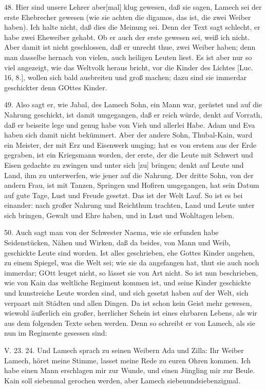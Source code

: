 48. Hier sind unsere Lehrer aber[mal] klug gewesen, daß sie sagen, Lamech sei der erste Ehebrecher gewesen (wie sie achten die digamos, das ist, die zwei Weiber haben). Ich halte nicht, daß dies die Meinung sei. Denn der Text sagt schlecht, er habe zwei Eheweiber gehabt. Ob er auch der erste gewesen sei, weiß ich nicht. Aber damit ist nicht geschlossen, daß er unrecht thue, zwei Weiber haben; denn man dasselbe hernach von vielen, auch heiligen Leuten liest. Es ist aber nur so viel angezeigt, wie das Weltvolk heraus bricht, vor die Kinder des Lichtes [Luc. 16, 8.], wollen sich bald ausbreiten und groß machen; dazu sind sie immerdar geschickter denn GOttes Kinder.

49. Also sagt er, wie Jabal, des Lamech Sohn, ein Mann war, gerüstet und auf die Nahrung geschickt, ist damit umgegangen, daß er reich würde, denkt auf Vorrath, daß er beiseite lege und genug habe von Vieh und allerlei Habe. Adam und Eva haben sich damit nicht bekümmert. Aber der andere Sohn, Thubal-Kain, ward ein Meister, der mit Erz und Eisenwerk umging; hat es von erstem aus der Erde gegraben, ist ein Kriegsmann worden, der erste, der die Leute mit Schwert und Eisen gedachte zu zwingen und unter sich [zu] bringen; denkt auf Leute und Land, ihm zu unterwerfen, wie jener auf die Nahrung. Der dritte Sohn, von der andern Frau, ist mit Tanzen, Springen und Hofiren umgegangen, hat sein Datum auf gute Tage, Lust und Freude gesetzt. Das ist der Welt Lauf. So ist es bei einander: nach großer Nahrung und Reichthum trachten, Land und Leute unter sich bringen, Gewalt und Ehre haben, und in Lust und Wohltagen leben.

50. Auch sagt man von der Schwester Naema, wie sie erfunden habe Seidenstücken, Nähen und Wirken, daß da beides, von Mann und Weib, geschickte Leute sind worden. Ist alles geschrieben, ehe Gottes Kinder angehen, zu einem Spiegel, was die Welt sei; wie sie da angefangen hat, thut sie auch noch immerdar; GOtt leuget nicht, so lässet sie von Art nicht. So ist nun beschrieben, wie von Kain das weltliche Regiment kommen ist, und seine Kinder geschickte und kunstreiche Leute worden sind, und sich gesetzt haben auf der Welt, sich verpaart mit Städten und allen Dingen. Da ist schon kein Geist mehr gewesen, wiewohl äußerlich ein großer, herrlicher Schein ist eines ehrbaren Lebens, als wir aus dem folgenden Texte sehen werden. Denn so schreibt er von Lamech, als sie nun im Regimente gesessen sind:

\begin{schriftzitat}
V. 23. 24. Und Lamech sprach zu seinen Weibern Ada und Zilla: Ihr Weiber Lamech, höret meine Stimme, lasset meine Rede zu euren Ohren kommen. Ich habe einen Mann erschlagen mir zur Wunde, und einen Jüngling mir zur Beule. Kain soll siebenmal gerochen werden, aber Lamech siebenundsiebenzigmal.
\end{schriftzitat}

